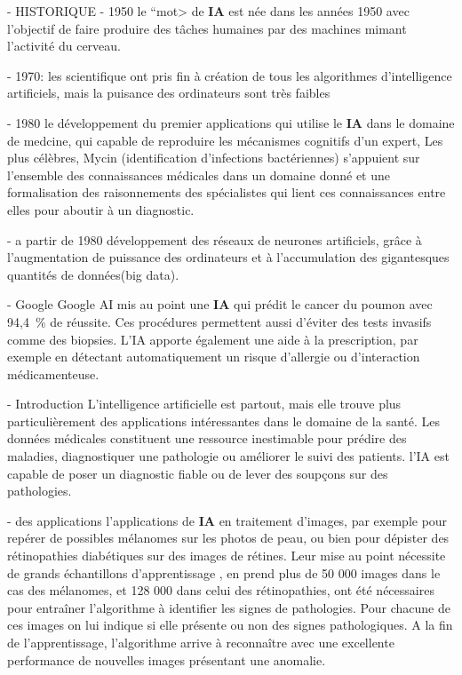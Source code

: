 

- HISTORIQUE
- 1950
    le ``mot> de \textbf{IA} est née dans les années 1950 avec l'objectif de faire
    produire des tâches humaines par des machines mimant l'activité du
    cerveau. %

- 1970: 
    les scientifique ont pris fin à création de tous les algorithmes
    d'intelligence artificiels, mais la puisance des ordinateurs sont très
    faibles

- 1980
    le développement du premier applications qui utilise le \textbf{IA} dans le
    domaine de medcine, qui capable de reproduire les mécanismes cognitifs
    d'un expert, Les plus célèbres, Mycin (identification d'infections
    bactériennes) s'appuient sur l'ensemble des connaissances médicales
    dans un domaine donné et une formalisation des raisonnements des
    spécialistes qui lient ces connaissances entre elles pour aboutir à un
    diagnostic.

- a partir de  1980
    développement des réseaux de neurones artificiels, grâce à l'augmentation
    de puissance des ordinateurs et à l'accumulation des gigantesques quantités
    de données(big data).

- Google
    Google AI mis au point une \textbf{IA} qui prédit le cancer du poumon avec
    94,4~\% de réussite. Ces procédures permettent aussi d'éviter des
    tests invasifs comme des biopsies. L'IA apporte également une aide à
    la prescription, par exemple en détectant automatiquement un risque
    d'allergie ou d'interaction médicamenteuse.



- Introduction
    L'intelligence artificielle est partout, mais elle
    trouve plus particulièrement des applications intéressantes dans le
    domaine de la santé. Les données médicales constituent une ressource
    inestimable pour prédire des maladies, diagnostiquer une pathologie ou
    améliorer le suivi des patients.
    l'IA est capable de poser un diagnostic fiable ou de lever des
    soupçons sur des pathologies.



- des applications
    l'applications de \textbf{IA} en traitement d'images,
    par exemple pour repérer de possibles mélanomes
    sur les photos de peau, ou bien pour dépister des rétinopathies
    diabétiques sur des images de rétines. Leur mise au point nécessite de
    grands échantillons d'apprentissage , en prend plus de 50 000 images dans le cas des
    mélanomes, et 128 000 dans celui des rétinopathies, ont été
    nécessaires pour entraîner l'algorithme à identifier les signes de
    pathologies. Pour chacune de ces images on lui indique si elle
    présente ou non des signes pathologiques. A la fin de l'apprentissage,
    l'algorithme arrive à reconnaître avec une excellente performance de
    nouvelles images présentant une anomalie. 

